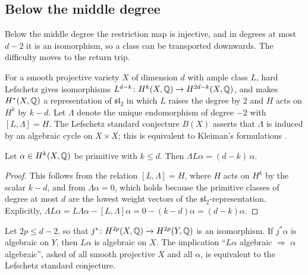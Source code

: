 \subsection{Below the middle degree}

Below the middle degree the restriction map is injective, and in degrees at
most $d-2$ it is an isomorphism, so a class can be transported downwards. The
difficulty moves to the return trip.

\begin{definition}\label{def:Bconj}
For a smooth projective variety $X$ of dimension $d$ with ample class $L$,
hard Lefschetz gives isomorphisms
$L^{d-k}\colon H^{k}(X,\mathbb{Q})\to H^{2d-k}(X,\mathbb{Q})$, and makes $H^{*}(X,\mathbb{Q})$
a representation of $\mathfrak{sl}_{2}$ in which $L$ raises the degree by
$2$ and $H$ acts on $H^{k}$ by $k-d$. Let $\Lambda$ denote the unique
endomorphism of degree $-2$ with $[L,\Lambda]=H$. The Lefschetz standard
conjecture $B(X)$ asserts that $\Lambda$ is induced by an algebraic cycle on
$X\times X$; this is equivalent to Kleiman's formulations \cite{Kle68,Kle94}.
\end{definition}

\begin{lemma}\label{lem:LambdaL}
Let $\alpha\in H^{k}(X,\mathbb{Q})$ be primitive with $k\le d$. Then
$\Lambda L\alpha=(d-k)\,\alpha$.
\end{lemma}

\begin{proof}
This follows from the relation $[L,\Lambda]=H$, where $H$ acts on $H^{k}$ by
the scalar $k-d$, and from $\Lambda\alpha=0$, which holds because the
primitive classes of degree at most $d$ are the lowest weight vectors of the
$\mathfrak{sl}_{2}$-representation. Explicitly,
$\Lambda L\alpha=L\Lambda\alpha-[L,\Lambda]\alpha=0-(k-d)\alpha
=(d-k)\alpha$.
\end{proof}

\begin{theorem}\label{thm:returntrip}
Let $2p\le d-2$, so that $j^{*}\colon H^{2p}(X,\mathbb{Q})\to H^{2p}(Y,\mathbb{Q})$ is an
isomorphism. If $j^{*}\alpha$ is algebraic on $Y$, then $L\alpha$ is algebraic
on $X$. The implication ``$L\alpha$ algebraic $\Rightarrow$ $\alpha$
algebraic'', asked of all smooth projective $X$ and all $\alpha$, is
equivalent to the Lefschetz standard conjecture.
\end{theorem}

